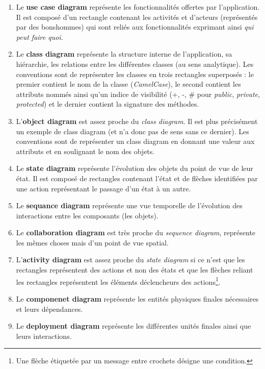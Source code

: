 \documentclass{article}
\begin{document}
		\begin{enumerate}
			\item Le \textbf{use case diagram} représente les fonctionnalités offertes par l'application. Il est composé d'un rectangle contenant les activités et d'acteurs (représentés
				par des bonshommes) qui sont reliés aux fonctionnalités exprimant ainsi \textit{qui peut faire quoi}.
			\item Le \textbf{class diagram} représente la structure interne de l'application, sa hiérarchie, les relations entre les différentes classes (au sens analytique).
				Les conventions sont de représenter les classes en trois rectangles superposés : le premier contient le nom de la classe (\textit{CamelCase}), le second contient
				les attributs nommés ainsi qu'un indice de visibilité (+, -, \# pour \textit{public}, \textit{private}, \textit{protected}) et le dernier contient la signature des méthodes.
			\item L'\textbf{object diagram} est assez proche du \textit{class diagram}. Il est plus précisément un exemple de class diagram (et n'a donc pas de sens sans ce dernier).
				Les conventions sont de représenter un class diagram en donnant une valeur aux attributs et en soulignant le nom des objets.
			\item Le \textbf{state diagram} représente l'évolution des objets du point de vue de leur état. Il est composé de rectangles contenant l'état et de flèches identifiées par
				une action représentant le passage d'un état à un autre.
			\item Le \textbf{sequance diagram} représente une vue temporelle de l'évolution des interactions entre les composants (les objets).
			\item Le \textbf{collaboration diagram} est très proche du \textit{sequence diagram}, représente les mêmes choses mais d'un point de vue spatial.
			\item L'\textbf{activity diagram} est assez proche du \textit{state diagram} si ce n'est que les rectangles représentent des actions et non des états et que les flèches reliant
				les rectangles représentent les éléments déclencheurs des actions\footnote{Une flèche étiquetée par un message entre crochets désigne une condition.}.
			\item Le \textbf{componenet diagram} représente les entités physiques finales nécessaires et leurs dépendances.
			\item Le \textbf{deployment diagram} représente les différentes unités finales ainsi que leurs interactions.
		\end{enumerate}
	
\end{document}
